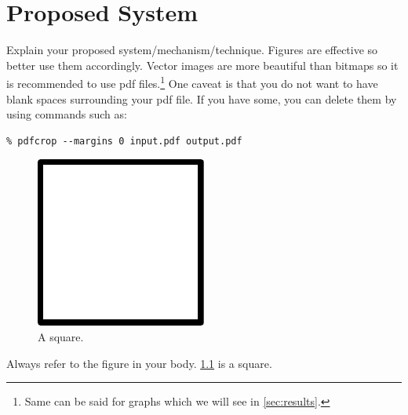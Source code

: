 \chapter{Proposed System}\label{ch:proposedsytem}

Explain your proposed system/mechanism/technique.
Figures are effective so better use them accordingly.
Vector images are more beautiful than bitmaps so it is recommended to use pdf files.\footnote{Same can be said for graphs which we will see in \cref{sec:results}.}
One caveat is that you do not want to have blank spaces surrounding your pdf file.
If you have some, you can delete them by using commands such as:

\begin{verbatim}
% pdfcrop --margins 0 input.pdf output.pdf
\end{verbatim}


\begin{figure}[ht]
  \centering
  \includegraphics[width=0.5\textwidth]{examples/figures/square}
  \caption{A square.}\label{fig:square}
\end{figure}

Always refer to the figure in your body.
\cref{fig:square} is a square.


